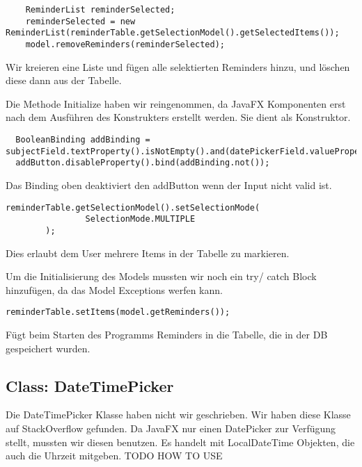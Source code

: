 \begin{lstlisting}
    ReminderList reminderSelected;
    reminderSelected = new ReminderList(reminderTable.getSelectionModel().getSelectedItems());
    model.removeReminders(reminderSelected);
\end{lstlisting}

Wir kreieren eine Liste und fügen alle selektierten Reminders hinzu, und löschen diese dann aus der Tabelle.


Die Methode Initialize haben wir reingenommen, da JavaFX Komponenten erst nach dem Ausführen des Konstrukters erstellt werden. Sie dient als Konstruktor.
\begin{lstlisting}
  BooleanBinding addBinding = subjectField.textProperty().isNotEmpty().and(datePickerField.valueProperty().isNotNull());
  addButton.disableProperty().bind(addBinding.not());
\end{lstlisting}
Das Binding oben deaktiviert den addButton wenn der Input nicht valid ist.

\begin{lstlisting}
reminderTable.getSelectionModel().setSelectionMode(
                SelectionMode.MULTIPLE
        );
\end{lstlisting}
Dies erlaubt dem User mehrere Items in der Tabelle zu markieren.

Um die Initialisierung des Models mussten wir noch ein try/ catch Block hinzufügen, da das Model Exceptions werfen kann.

\begin{lstlisting}
reminderTable.setItems(model.getReminders());
\end{lstlisting}
Fügt beim Starten des Programms Reminders in die Tabelle, die in der DB gespeichert wurden.

\subsection{Class: DateTimePicker}
Die DateTimePicker Klasse haben nicht wir geschrieben. Wir haben diese Klasse auf StackOverflow gefunden. Da JavaFX nur einen DatePicker zur Verfügung stellt, mussten wir diesen benutzen. Es handelt mit LocalDateTime Objekten, die auch die Uhrzeit mitgeben.
TODO HOW TO USE
